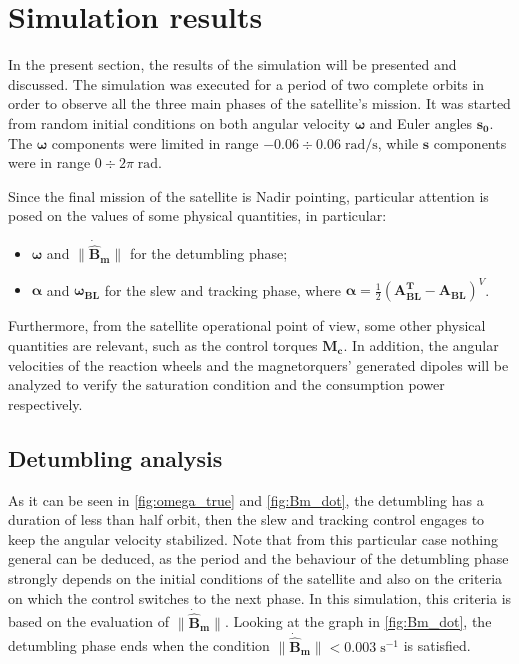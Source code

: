 \section{Simulation results}
\label{sec:sim_results}

In the present section, the results of the simulation will be presented and discussed. The simulation was executed for a period of two complete orbits in order to observe all the three main phases of the satellite's mission. It was started from random initial conditions on both angular velocity $\boldsymbol{\omega}$ and Euler angles $\boldsymbol{s_0}$.
The $\boldsymbol{\omega}$ components were limited in range $-0.06 \div 0.06 \; \text{rad/s}$, while $\boldsymbol{s}$ components were in range $0 \div 2 \pi \; \text{rad}$.

Since the final mission of the satellite is Nadir pointing, particular attention is posed on the values of some physical quantities, in particular:

\begin{itemize}[wide,itemsep=3pt,topsep=3pt]
    \item $\boldsymbol{\omega}$ and $\lVert \boldsymbol{\dot{\hat{{B}}}_m} \rVert$ for the detumbling phase;
    \item $\boldsymbol{\alpha}$ and $\boldsymbol{\omega_{BL}}$ for the slew and tracking phase, where $\boldsymbol{\alpha} = \frac{1}{2} \left(   \boldsymbol{A_{BL}^T - A_{BL}} \right)^V$.
\end{itemize}

Furthermore, from the satellite operational point of view, some other physical quantities are relevant, such as the control torques $\boldsymbol{M_c}$. In addition, the angular velocities of the reaction wheels and the magnetorquers' generated dipoles will be analyzed to verify the saturation condition and the consumption power respectively.


\subsection{Detumbling analysis}
\label{subsec:detumb_analysis}


As it can be seen in \autoref{fig:omega_true} and \autoref{fig:Bm_dot}, the detumbling has a duration of less than half orbit, then the slew and tracking control engages to keep the angular velocity stabilized. Note that from this particular case nothing general can be deduced, as the period and the behaviour of the detumbling phase strongly depends on the initial conditions of the satellite and also on the criteria on which the control switches to the next phase. In this simulation, this criteria is based on the evaluation of $\lVert \boldsymbol{\dot{\hat{{B}}}_m} \rVert$.
Looking at the graph in \autoref{fig:Bm_dot}, the detumbling phase ends when the condition $\lVert \boldsymbol{\dot{\hat{{B}}}_m} \rVert < 0.003 \; \text{s}^{-1}$ is satisfied.

